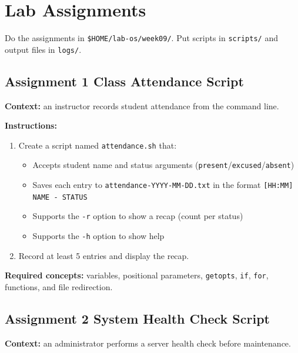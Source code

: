 \section{Lab Assignments}
\label{sec:lab-assignment-bash-prog}

\begin{warningbox}
Do the assignments in \texttt{\$HOME/lab-os/week09/}. Put scripts in
\texttt{scripts/} and output files in \texttt{logs/}.
\end{warningbox}

\subsection*{Assignment 1 Class Attendance Script}

\textbf{Context:} an instructor records student attendance from the command
line.

\textbf{Instructions:}
\begin{enumerate}
  \item Create a script named \texttt{attendance.sh} that:
  \begin{itemize}
    \item Accepts student name and status arguments
      (\texttt{present}/\texttt{excused}/\texttt{absent})
    \item Saves each entry to \texttt{attendance-YYYY-MM-DD.txt} in the format
      \texttt{[HH:MM] NAME - STATUS}
    \item Supports the \texttt{-r} option to show a recap (count per status)
    \item Supports the \texttt{-h} option to show help
  \end{itemize}
  \item Record at least 5 entries and display the recap.
\end{enumerate}

\textbf{Required concepts:} variables, positional parameters,
\texttt{getopts}, \texttt{if}, \texttt{for}, functions, and file
redirection.

\subsection*{Assignment 2 System Health Check Script}

\textbf{Context:} an administrator performs a server health check before
maintenance.

